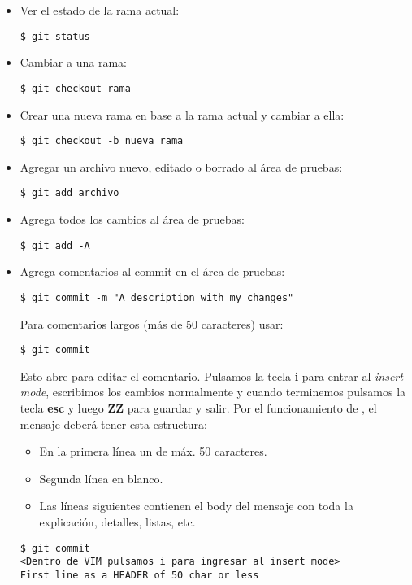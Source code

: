 \begin{itemize}[label=-]

\item Ver el estado de la rama actual:
\begin{lstlisting}
$ git status
\end{lstlisting}

\item Cambiar a una rama:
\begin{lstlisting}
$ git checkout rama
\end{lstlisting}

\item Crear una nueva rama en base a la rama actual y cambiar a ella:
\begin{lstlisting}
$ git checkout -b nueva_rama
\end{lstlisting}

\item Agregar un archivo nuevo, editado o borrado al área de pruebas:
\begin{lstlisting}
$ git add archivo
\end{lstlisting}

\item Agrega todos los cambios al área de pruebas:
\begin{lstlisting}
$ git add -A
\end{lstlisting}

\item Agrega comentarios al commit en el área de pruebas:
\begin{lstlisting}
$ git commit -m "A description with my changes"
\end{lstlisting}
Para comentarios largos (más de 50 caracteres) usar:
\begin{lstlisting}
$ git commit
\end{lstlisting}
Esto abre  para editar el comentario. Pulsamos la tecla \textbf{i} para entrar al \textit{insert mode}, escribimos los cambios normalmente y cuando terminemos pulsamos la tecla \textbf{esc} y luego \textbf{ZZ} para guardar y salir. Por el funcionamiento de , el mensaje deberá tener esta estructura:
\begin{itemize}
\item En la primera línea un  de máx. 50 caracteres.
\item Segunda línea en blanco.
\item Las líneas siguientes contienen el body del mensaje con toda la explicación, detalles, listas, etc.
\end{itemize}
\begin{lstlisting}
$ git commit
<Dentro de VIM pulsamos i para ingresar al insert mode>
First line as a HEADER of 50 char or less


\end{lstlisting}
\end{itemize}
